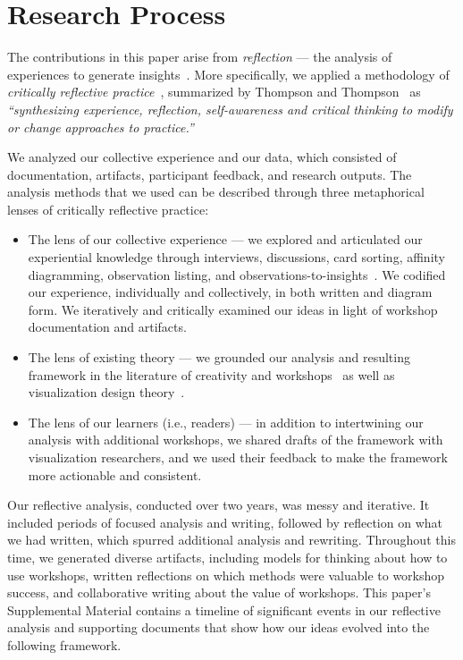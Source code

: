 \section{Research Process}
\label{sec:research}

The contributions in this paper arise from {\it reflection} --- the analysis of experiences to generate insights~\cite{Boud1985,Schon1988}. More specifically, we applied a methodology of {\it critically reflective practice}~\cite{Brookfield1998}, summarized by Thompson and Thompson~\cite{Thompson2008} as {\it ``synthesizing experience, reflection, self-awareness and critical thinking to modify or change approaches to practice.''}

We analyzed our collective experience and our \workshop data, which consisted of documentation, artifacts, participant feedback, and research outputs. The analysis methods that we used can be described through three metaphorical lenses of critically reflective practice:
\begin{itemize}[nolistsep,noitemsep]
\item The lens of our collective experience --- we explored and articulated our experiential knowledge through interviews, discussions, card sorting, affinity diagramming, observation listing, and observations-to-insights~\cite{Kumar2012}. We codified our experience, individually and collectively, in both written and diagram form. We iteratively and critically examined our ideas in light of workshop documentation and artifacts.
\item The lens of existing theory --- we grounded our analysis and resulting framework in the literature of creativity and workshops~\cite{CreativeEducationFoundation2015,Biskjaer2017,DeBono1983,Gordon1961,Hamilton2016,Miller1989,Nickerson1999,Osborn1953,Sawyer2003,Sawyer2006,Shneiderman2005} as well as visualization design theory~\cite{McKenna2014,Munzner2009,Sedlmair2010,Tory2004}. 
\item The lens of our learners (i.e., readers) --- in addition to intertwining our analysis with additional workshops, we shared drafts of the framework with visualization researchers, and we used their feedback to make the framework more actionable and consistent.
\end{itemize}

Our reflective analysis, conducted over two years, was messy and iterative. It included periods of focused analysis and writing, followed by reflection on what we had written, which spurred additional analysis and rewriting. Throughout this time, we generated diverse artifacts, including models for thinking about how to use workshops, written reflections on which methods were valuable to workshop success, and collaborative writing about the value of workshops. This paper's Supplemental Material contains a timeline of significant events in our reflective analysis and \numberOfAudits supporting documents that show how our ideas evolved into the following framework.